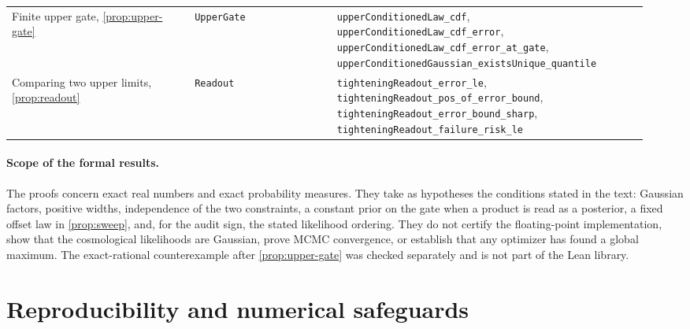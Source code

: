 \documentclass[11pt]{article}
\theoremstyle{remark}
\numberwithin{equation}{section}
\begin{document}
\begin{table}[h]
\begin{tabular}{@{}>{\raggedright\arraybackslash}p{0.27\linewidth} >{\raggedright\arraybackslash}p{0.21\linewidth} >{\raggedright\arraybackslash}p{0.46\linewidth}@{}}
    Finite upper gate, \cref{prop:upper-gate} & \texttt{UpperGate} & \texttt{upperConditionedLaw\_\allowbreak{}cdf}, \texttt{upperConditionedLaw\_\allowbreak{}cdf\_\allowbreak{}error}, \texttt{upperConditionedLaw\_\allowbreak{}cdf\_\allowbreak{}error\_\allowbreak{}at\_\allowbreak{}gate}, \texttt{upperConditionedGaussian\_\allowbreak{}existsUnique\_\allowbreak{}quantile} \\
    Comparing two upper limits, \cref{prop:readout} & \texttt{Readout} & \texttt{tighteningReadout\_\allowbreak{}error\_\allowbreak{}le}, \texttt{tighteningReadout\_\allowbreak{}pos\_\allowbreak{}of\_\allowbreak{}error\_\allowbreak{}bound}, \texttt{tighteningReadout\_\allowbreak{}error\_\allowbreak{}bound\_\allowbreak{}sharp}, \texttt{tighteningReadout\_\allowbreak{}failure\_\allowbreak{}risk\_\allowbreak{}le} \\
    \bottomrule
  \end{tabular}
\end{table}

\paragraph{Scope of the formal results.}
The proofs concern exact real numbers and exact probability measures. They take as hypotheses the conditions stated in the text: Gaussian factors, positive widths, independence of the two constraints, a constant prior on the gate when a product is read as a posterior, a fixed offset law in \cref{prop:sweep}, and, for the audit sign, the stated likelihood ordering. They do not certify the floating-point implementation, show that the cosmological likelihoods are Gaussian, prove MCMC convergence, or establish that any optimizer has found a global maximum. The exact-rational counterexample after \cref{prop:upper-gate} was checked separately and is not part of the Lean library.
 \section{Reproducibility and numerical safeguards}
\label{app:reproducibility}
\end{document}
